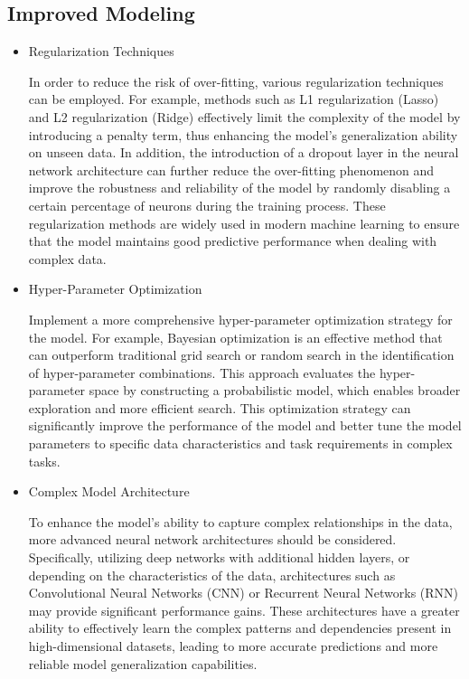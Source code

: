 \documentclass[conference]{IEEEtran}
\begin{document}
\subsection{Improved Modeling}

\begin{itemize}
\item Regularization Techniques

In order to reduce the risk of over-fitting, various regularization techniques can be employed. For example, methods such as L1 regularization (Lasso) and L2 regularization (Ridge) effectively limit the complexity of the model by introducing a penalty term, thus enhancing the model's generalization ability on unseen data. In addition, the introduction of a dropout layer in the neural network architecture can further reduce the over-fitting phenomenon and improve the robustness and reliability of the model by randomly disabling a certain percentage of neurons during the training process. These regularization methods are widely used in modern machine learning to ensure that the model maintains good predictive performance when dealing with complex data.

\item Hyper-Parameter Optimization

Implement a more comprehensive hyper-parameter optimization strategy for the model. For example, Bayesian optimization is an effective method that can outperform traditional grid search or random search in the identification of hyper-parameter combinations. This approach evaluates the hyper-parameter space by constructing a probabilistic model, which enables broader exploration and more efficient search. This optimization strategy can significantly improve the performance of the model and better tune the model parameters to specific data characteristics and task requirements in complex tasks.

\item Complex Model Architecture

To enhance the model's ability to capture complex relationships in the data, more advanced neural network architectures should be considered. Specifically, utilizing deep networks with additional hidden layers, or depending on the characteristics of the data, architectures such as Convolutional Neural Networks (CNN) or Recurrent Neural Networks (RNN) may provide significant performance gains. These architectures have a greater ability to effectively learn the complex patterns and dependencies present in high-dimensional datasets, leading to more accurate predictions and more reliable model generalization capabilities.

\end{itemize}
\end{document}
